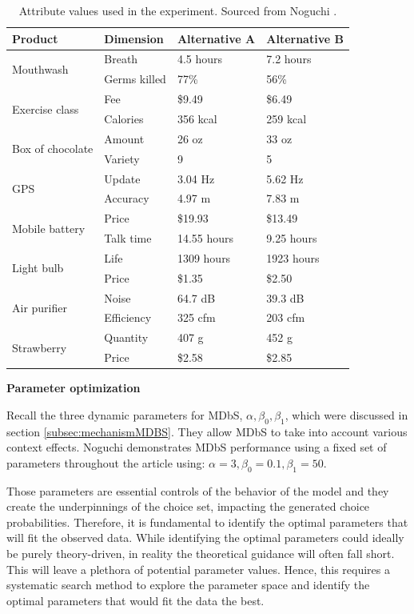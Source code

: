 \documentclass[a4paper,12pt]{article}
\newcommand{\citeyearonly}[1]{\citeyearpar{#1}}
\begin{document}
\begin{table}
\centering

\begin{tabular}{l|lll}
\hline
Product & Dimension & Alternative A & Alternative B \\
\hline
\multirow{2}{*}{Mouthwash} & Breath & 4.5 hours & 7.2 hours \\
 & Germs killed & 77\% & 56\% \\[2ex]
\multirow{2}{*}{Exercise class} & Fee & \$9.49 & \$6.49 \\
 & Calories & 356 kcal & 259 kcal \\[2ex]
\multirow{2}{*}{Box of chocolate} & Amount & 26 oz & 33 oz \\
 & Variety & 9 & 5 \\[2ex]
\multirow{2}{*}{GPS} & Update & 3.04 Hz & 5.62 Hz \\
 & Accuracy & 4.97 m & 7.83 m \\[2ex]
\multirow{2}{*}{Mobile battery} & Price & \$19.93 & \$13.49 \\
 & Talk time & 14.55 hours & 9.25 hours \\[2ex]
\multirow{2}{*}{Light bulb} & Life & 1309 hours & 1923 hours \\
 & Price & \$1.35 & \$2.50 \\[2ex]
\multirow{2}{*}{Air purifier} & Noise & 64.7 dB & 39.3 dB \\
 & Efficiency & 325 cfm & 203 cfm \\[2ex]
\multirow{2}{*}{Strawberry} & Quantity & 407 g & 452 g \\
 & Price & \$2.58 & \$2.85 \\
\hline
\end{tabular}
\caption[Attribute values used in experiment]{Attribute values used in the experiment. Sourced from Noguchi \citeyearonly{noguchi2018multialternative}.}
\label{tab:noguchiDescriptions}
\end{table}

\textbf{Parameter optimization}

Recall the three dynamic parameters for MDbS, $\alpha, \beta_0, \beta_1$, which were discussed in section \ref{subsec:mechanismMDBS}. They allow MDbS to take into account various context effects. Noguchi \citeyearonly{noguchi2018multialternative} demonstrates MDbS performance using a fixed set of parameters throughout the article using: $\alpha = 3, \beta_0 = 0.1, \beta_1 = 50$. 

Those parameters are essential controls of the behavior of the model and they create the underpinnings of the choice set, impacting the generated choice probabilities. Therefore, it is fundamental to identify the optimal parameters that will fit the observed data. While identifying the optimal parameters could ideally be purely theory-driven, in reality the theoretical guidance will often fall short. This will leave a plethora of potential parameter values. Hence, this requires a systematic search method to explore the parameter space and identify the optimal parameters that would fit the data the best.
\end{document}
